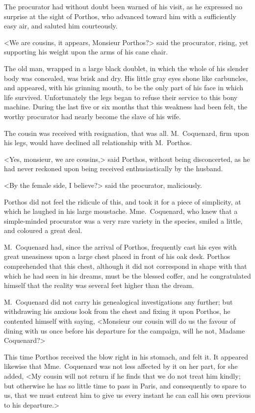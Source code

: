 The procurator had without doubt been warned of his visit, as he expressed no surprise at the sight of Porthos, who advanced toward him with a sufficiently easy air, and saluted him courteously. 

<We are cousins, it appears, Monsieur Porthos?> said the procurator, rising, yet supporting his weight upon the arms of his cane chair. 

The old man, wrapped in a large black doublet, in which the whole of his slender body was concealed, was brisk and dry. His little gray eyes shone like carbuncles, and appeared, with his grinning mouth, to be the only part of his face in which life survived. Unfortunately the legs began to refuse their service to this bony machine. During the last five or six months that this weakness had been felt, the worthy procurator had nearly become the slave of his wife. 

The cousin was received with resignation, that was all. M.~Coquenard, firm upon his legs, would have declined all relationship with M.~Porthos. 

<Yes, monsieur, we are cousins,> said Porthos, without being disconcerted, as he had never reckoned upon being received enthusiastically by the husband. 

<By the female side, I believe?> said the procurator, maliciously. 

Porthos did not feel the ridicule of this, and took it for a piece of simplicity, at which he laughed in his large moustache. Mme.~Coquenard, who knew that a simple-minded procurator was a very rare variety in the species, smiled a little, and coloured a great deal. 

M.~Coquenard had, since the arrival of Porthos, frequently cast his eyes with great uneasiness upon a large chest placed in front of his oak desk. Porthos comprehended that this chest, although it did not correspond in shape with that which he had seen in his dreams, must be the blessed coffer, and he congratulated himself that the reality was several feet higher than the dream. 

M.~Coquenard did not carry his genealogical investigations any further; but withdrawing his anxious look from the chest and fixing it upon Porthos, he contented himself with saying, <Monsieur our cousin will do us the favour of dining with us once before his departure for the campaign, will he not, Madame Coquenard?> 

This time Porthos received the blow right in his stomach, and felt it. It appeared likewise that Mme.~Coquenard was not less affected by it on her part, for she added, <My cousin will not return if he finds that we do not treat him kindly; but otherwise he has so little time to pass in Paris, and consequently to spare to us, that we must entreat him to give us every instant he can call his own previous to his departure.> 


